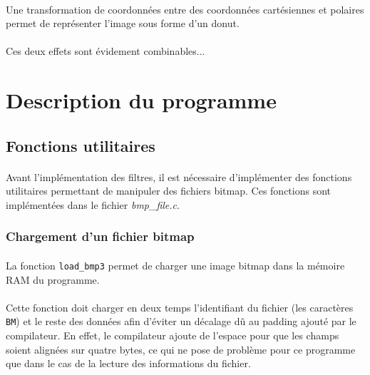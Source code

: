 \documentclass{article}
\begin{document}
    \paragraph{}
    Une transformation de coordonnées entre des coordonnées cartésiennes et polaires permet de représenter l’image sous forme d’un donut.
    
    \paragraph{}
    Ces deux effets sont évidement combinables...


    \newpage
    \section{Description du programme}
    \subsection{Fonctions utilitaires}
    \paragraph{}
    Avant l'implémentation des filtres, il est nécessaire d'implémenter des fonctions utilitaires permettant de manipuler des fichiers bitmap. Ces fonctions sont implémentées dans le fichier \emph{bmp\_file.c}.


    \subsubsection{Chargement d'un fichier bitmap}
    \paragraph{}
    La fonction \texttt{load\_bmp3} permet de charger une image bitmap dans la mémoire RAM du programme.
    
    \paragraph{}
    Cette fonction doit charger en deux temps l'identifiant du fichier (les caractères \texttt{BM}) et le reste des données afin d'éviter un décalage dû au padding ajouté par le compilateur. En effet, le compilateur ajoute de l'espace pour que les champs soient alignées sur quatre bytes, ce qui ne pose de problème pour ce programme que dans le cas de la lecture des informations du fichier.
    
\end{document}
